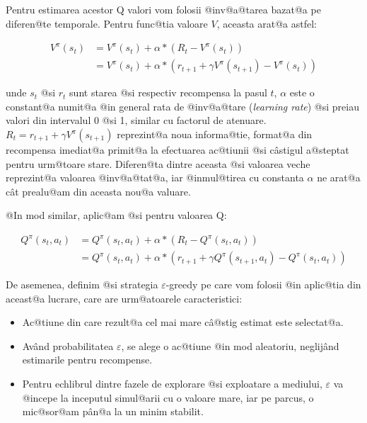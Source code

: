 Pentru estimarea acestor Q valori vom folosii @inv@a@tarea bazat@a pe diferen@te temporale. Pentru func@tia valoare $V$, aceasta arat@a astfel:



\begin{align}
	V^{\pi}(s_t) & =  V^{\pi}(s_t) + \alpha * \left( R_t - V^{\pi}(s_t) \right) \\
	 & =  V^{\pi}(s_t) + \alpha * \left( r_{t+1} + \gamma V^{\pi}(s_{t+1})  - V^{\pi}(s_t) \right)
\end{align}

\noindent unde $s_t$ @si $r_t$ sunt starea @si respectiv recompensa la pasul $t$, $\alpha$ este o constant@a numit@a @in general rata de @inv@a@tare (\textsl{learning rate}) @si preiau valori din intervalul 0 @si 1, similar cu factorul de atenuare. $R_t = r_{t+1} + \gamma V^{\pi}(s_{t+1}) $ reprezint@a noua informa@tie, format@a din recompensa imediat@a primit@a la efectuarea ac@tiunii @si c\^ astigul a@steptat pentru urm@toare stare. Diferen@ta dintre aceasta @si valoarea veche reprezint@a valoarea @inv@a@tat@a, iar @inmul@tirea cu constanta $\alpha$ ne arat@a c\^ at prealu@am din aceasta nou@a valuare.

@In mod similar, aplic@am @si pentru valoarea Q:

\begin{align}
	Q^{\pi}(s_t, a_t) & =  Q^{\pi}(s_t, a_t) + \alpha * \left( R_t - Q^{\pi}(s_t, a_t) \right) \\
	 & =  Q^{\pi}(s_t, a_t) + \alpha * \left( r_{t+1} + \gamma Q^{\pi}(s_{t+1}, a_t)  - Q^{\pi}(s_t, a_t) \right)
\end{align}

 De asemenea, definim @si strategia $\varepsilon$-greedy pe care vom folosii @in aplic@tia din aceast@a lucrare, care are urm@atoarele caracteristici:

\begin{itemize}
	\item Ac@tiune din care rezult@a cel mai mare c\^ a@stig estimat este selectat@a.
	\item Av\^ and probabilitatea $\varepsilon$, se alege o ac@tiune @in mod aleatoriu, neglij\^and estimarile pentru recompense.
	\item Pentru echlibrul dintre fazele de explorare @si exploatare a mediului, $\varepsilon$ va @incepe la inceputul simul@arii cu o valoare mare, iar pe parcus, o mic@sor@am p\^ an@a la un minim stabilit.
\end{itemize}

